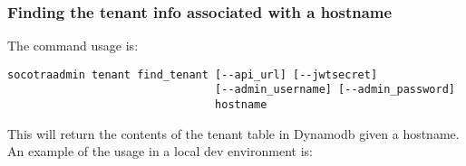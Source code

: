 \hypertarget{finding-the-tenant-info-associated-with-a-hostname}{%
\subsubsection{Finding the tenant info associated with a
hostname}\label{finding-the-tenant-info-associated-with-a-hostname}}

The command usage is:

\begin{verbatim}
socotraadmin tenant find_tenant [--api_url] [--jwtsecret]
                                [--admin_username] [--admin_password]
                                hostname
\end{verbatim}

This will return the contents of the tenant table in Dynamodb given a
hostname. An example of the usage in a local dev environment is:

\begin{Shaded}
\begin{Highlighting}[]
 
\end{Highlighting}
\end{Shaded}

